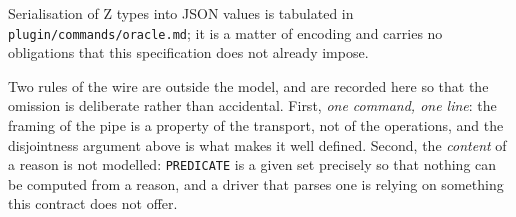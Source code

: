 \documentclass[a4paper,10pt,fleqn]{article}
\begin{document}
Serialisation of Z types into JSON values is tabulated in
\texttt{plugin/commands/oracle.md}; it is a matter of encoding and carries no
obligations that this specification does not already impose.

Two rules of the wire are outside the model, and are recorded here so
that the omission is deliberate rather than accidental. First,
\emph{one command, one line}: the framing of the pipe is a property of
the transport, not of the operations, and the disjointness argument above
is what makes it well defined. Second, the \emph{content} of a reason is
not modelled: \texttt{PREDICATE} is a given set precisely so that nothing
can be computed from a reason, and a driver that parses one is relying on
something this contract does not offer.
\end{document}
